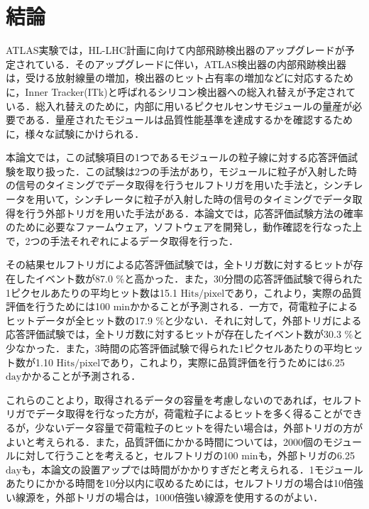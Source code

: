 \chapter{結論}
ATLAS実験では，HL-LHC計画に向けて内部飛跡検出器のアップグレードが予定されている．そのアップグレードに伴い，ATLAS検出器の内部飛跡検出器は，受ける放射線量の増加，検出器のヒット占有率の増加などに対応するために，Inner Tracker(ITk)と呼ばれるシリコン検出器への総入れ替えが予定されている．総入れ替えのために，内部に用いるピクセルセンサモジュールの量産が必要である．量産されたモジュールは品質性能基準を達成するかを確認するために，様々な試験にかけられる．\par
本論文では，この試験項目の1つであるモジュールの粒子線に対する応答評価試験を取り扱った．この試験は2つの手法があり，モジュールに粒子が入射した時の信号のタイミングでデータ取得を行うセルフトリガを用いた手法と，シンチレータを用いて，シンチレータに粒子が入射した時の信号のタイミングでデータ取得を行う外部トリガを用いた手法がある．本論文では，応答評価試験方法の確率のために必要なファームウェア，ソフトウェアを開発し，動作確認を行なった上で，2つの手法それぞれによるデータ取得を行った．\par
その結果セルフトリガによる応答評価試験では，全トリガ数に対するヒットが存在したイベント数が87.0 \%と高かった．また，30分間の応答評価試験で得られた1ピクセルあたりの平均ヒット数は15.1 $\mathrm{Hits/pixel}$であり，これより，実際の品質評価を行うためには100 $\mathrm{min}$かかることが予測される．一方で，荷電粒子によるヒットデータが全ヒット数の17.9 \%と少ない．それに対して，外部トリガによる応答評価試験では，全トリガ数に対するヒットが存在したイベント数が30.3 \%と少なかった．また，3時間の応答評価試験で得られた1ピクセルあたりの平均ヒット数が1.10 $\mathrm{Hits/pixel}$であり，これより，実際に品質評価を行うためには6.25 $\mathrm{day}$かかることが予測される．\par
これらのことより，取得されるデータの容量を考慮しないのであれば，セルフトリガでデータ取得を行なった方が，荷電粒子によるヒットを多く得ることができるが，少ないデータ容量で荷電粒子のヒットを得たい場合は，外部トリガの方がよいと考えられる．また，品質評価にかかる時間については，2000個のモジュールに対して行うことを考えると，セルフトリガの100 $\mathrm{min}$も，外部トリガの6.25 $\mathrm{day}$も，本論文の設置アップでは時間がかかりすぎだと考えられる．1モジュールあたりにかかる時間を10分以内に収めるためには，セルフトリガの場合は10倍強い線源を，外部トリガの場合は，1000倍強い線源を使用するのがよい．

